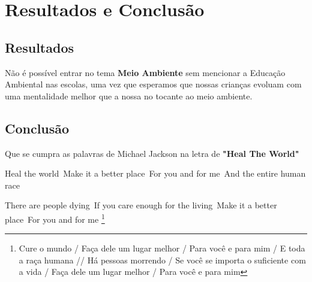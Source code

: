\chapter{Resultados e Conclusão}

\section{Resultados}

Não é possível entrar no tema \textbf{Meio Ambiente} sem mencionar a Educação Ambiental nas escolas, uma vez que esperamos que nossas crianças evoluam com uma mentalidade melhor que a nossa no tocante ao meio ambiente.



\section{Conclusão}

Que se cumpra as palavras de Michael Jackson na letra de \textbf{"Heal The World"}

\begin{citacao}
    Heal the world\
    Make it a better place\
    For you and for me\
    And the entire human race\

    There are people dying\
    If you care enough for the living\
    Make it a better place\
    For you and for me \footnote{
        Cure o mundo / Faça dele um lugar melhor / Para você e para mim / E toda a raça humana //
        Há pessoas morrendo / Se você se importa o suficiente com a vida / Faça dele um lugar melhor / Para você e para mim
    }
\end{citacao}
